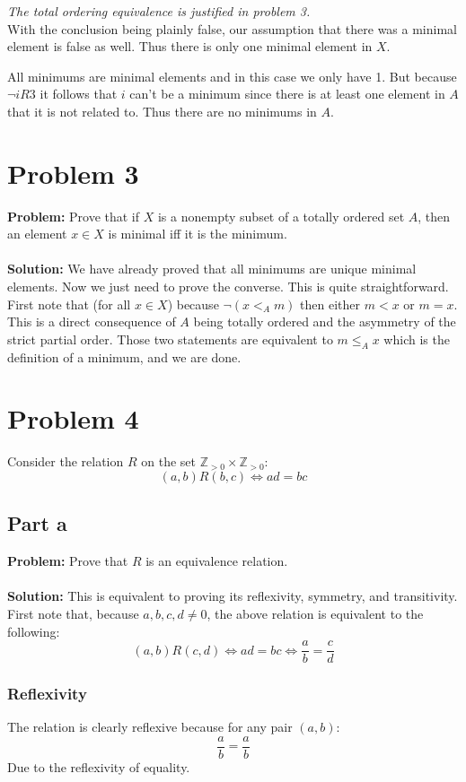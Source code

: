 \documentclass{article}
\begin{document}
\textit{The total ordering equivalence is justified in problem 3.}
\\

With the conclusion being plainly false, our assumption that there was a minimal element is false as well. Thus there is only one minimal element in $X$.

All minimums are minimal elements and in this case we only have 1. But because $\neg iR3$ it follows that $i$ can't be a minimum since there is at least one element in $A$ that it is not related to. Thus there are no minimums in $A$.

\section*{Problem 3}
\textbf{Problem:} Prove that if $X$ is a nonempty subset of a totally ordered set $A$, then an element $x\in X$ is minimal iff it is the minimum.
\\\\
\textbf{Solution:} We have already proved that all minimums are unique minimal elements. Now we just need to prove the converse. This is quite straightforward. First note that (for all $x\in X$) because $\neg(x<_Am)$ then either $m<x$ or $m=x$. This is a direct consequence of $A$ being totally ordered and the asymmetry of the strict partial order. Those two statements are equivalent to $m\le_A x$ which is the definition of a minimum, and we are done.

\section*{Problem 4}
Consider the relation $R$ on the set $\mathbb Z_{>0}\times\mathbb Z_{>0}$:
$$(a,b)R(b,c)\iff ad=bc$$
\subsection*{Part a}
\textbf{Problem:} Prove that $R$ is an equivalence relation.
\\\\
\textbf{Solution:} This is equivalent to proving its reflexivity, symmetry, and transitivity. First note that, because $a,b,c,d\not=0$, the above relation is equivalent to the following:
$$(a,b)R(c,d)\iff ad=bc\iff \frac{a}{b}=\frac{c}{d}$$

\subsubsection*{Reflexivity}
The relation is clearly reflexive because for any pair $(a,b)$:
$$\frac{a}{b}=\frac{a}{b}$$
Due to the reflexivity of equality.
\end{document}
